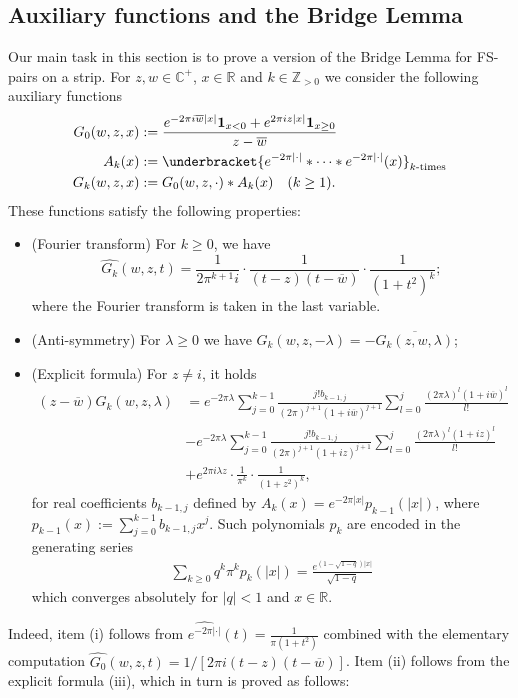 \documentclass[a4paper,reqno,12pt]{amsart}
\newcommand{\z}{\mathbb{Z}}
\renewcommand{\r}{\mathbb{R}}
\newcommand{\cp}{\mathbb{C}} %
\newcommand{\ft}{\widehat}
\newcommand{\la}{\lambda}
\newcommand{\ov}[1]{\overline{#1}}
\newcommand{\w}{\ov{w}}
\newcommand{\cd}{\cdot}
\newcommand{\1}{{\bf 1}}
\begin{document}
\subsection{Auxiliary functions and the Bridge Lemma} Our main task in this section is to prove a version of the Bridge Lemma \cite[Lemma 5]{GV} for FS-pairs on a strip. For $z,w\in\cp^+$, $x\in \r$ and $k\in \z_{>0}$ we consider the following auxiliary functions
\begin{align*}
G_0(w,z,x)& :=\frac{e^{-2\pi i\w|x|}\1_{x<0}+e^{2\pi iz|x|}\1_{x\geq0}}{z-\w} \\
A_k(x)&:=\underbracket{e^{-2\pi|\cd|}*\cdots * e^{-2\pi|\cd|}(x)}_{k \text{-times}}  \\
G_k(w,z,x)&:=G_0(w,z,\cd)* A_k(x) \quad (k\geq 1).
\end{align*}
These functions satisfy the following properties:
\begin{itemize}
\item [(i)] (Fourier transform) For $k\geq0$, we have 
\begin{equation}
\ft{G_k}(w,z,t)=\frac{1}{2\pi^{k+1}i}\cd\frac{1}{(t-z)(t-\w)}\cd\frac{1}{(1+t^2)^k};
\end{equation}
where the Fourier transform is taken in the last variable.
\item[(ii)] (Anti-symmetry) For $\la\geq0$ we have $G_k(w,z,-\la)=-\ov{G_k(z,w,\la)}$;
\item[(iii)] (Explicit formula) For $z\neq i$, it holds
\begin{align*}
(z-\w)G_k(w,z,\la)&=e^{-2\pi\la}\sum_{j=0}^{k-1} \frac{j!b_{k-1,j}}{(2\pi)^{j+1}(1+i\w)^{j+1}}\sum_{l=0}^{j} \frac{(2\pi\la)^l(1+i\w)^l}{l!}\\
&-e^{-2\pi\la}\sum_{j=0}^{k-1} \frac{j!b_{k-1,j}}{(2\pi)^{j+1}(1+iz)^{j+1}}\sum_{l=0}^{j} \frac{(2\pi\la)^l(1+iz)^l}{l!}\\
&+e^{2\pi i\la z}\cd\frac{1}{\pi^k}\cd\frac{1}{(1+z^2)^k},
\end{align*}
for real coefficients $b_{k-1,j}$ defined by $A_k(x)=e^{-2\pi|x|}p_{k-1}(|x|)$, where $p_{k-1}(x):=\sum_{j=0}^{k-1} b_{k-1,j}x^j$. Such polynomials $p_k$ are encoded in the generating series
\begin{align*}
 \sum_{k\geq 0} q^k \pi^k p_{k}(|x|)  =\frac{e^{(1-\sqrt{1-q})|x|}}{\sqrt{1-q}}
\end{align*}
which converges absolutely for $|q|<1 $ and $x\in \r$.
\end{itemize}
Indeed, item (i) follows from $\ft{e^{-2\pi|\cd|}}(t)=\frac{1}{\pi(1+t^2)}$ combined with the elementary computation $\ft{G_0}(w,z,t)=1/[2\pi i(t-z)(t-\w)]$. Item (ii) follows from the explicit formula (iii), which in turn is proved as follows:
\end{document}
